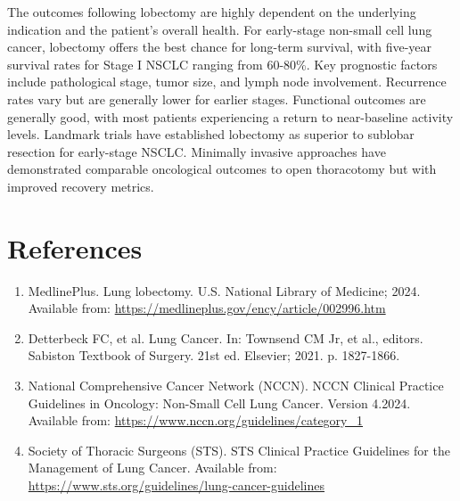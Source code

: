 The outcomes following lobectomy are highly dependent on the underlying indication and the patient's overall health. For early-stage non-small cell lung cancer, lobectomy offers the best chance for long-term survival, with five-year survival rates for Stage I NSCLC ranging from 60-80\%. Key prognostic factors include pathological stage, tumor size, and lymph node involvement. Recurrence rates vary but are generally lower for earlier stages. Functional outcomes are generally good, with most patients experiencing a return to near-baseline activity levels. Landmark trials have established lobectomy as superior to sublobar resection for early-stage NSCLC. Minimally invasive approaches have demonstrated comparable oncological outcomes to open thoracotomy but with improved recovery metrics.

\section*{References}
\begin{enumerate}
  \item MedlinePlus. Lung lobectomy. U.S. National Library of Medicine; 2024. Available from: \url{https://medlineplus.gov/ency/article/002996.htm}
  
  \item Detterbeck FC, et al. Lung Cancer. In: Townsend CM Jr, et al., editors. Sabiston Textbook of Surgery. 21st ed. Elsevier; 2021. p. 1827-1866.
  
  \item National Comprehensive Cancer Network (NCCN). NCCN Clinical Practice Guidelines in Oncology: Non-Small Cell Lung Cancer. Version 4.2024. Available from: \url{https://www.nccn.org/guidelines/category_1}
  
  \item Society of Thoracic Surgeons (STS). STS Clinical Practice Guidelines for the Management of Lung Cancer. Available from: \url{https://www.sts.org/guidelines/lung-cancer-guidelines}
\end{enumerate}

\clearpage
